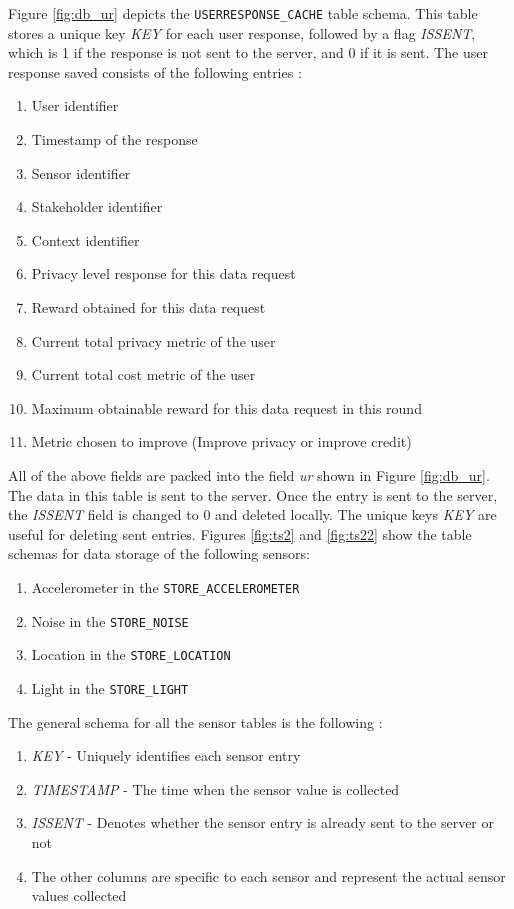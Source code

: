 Figure \ref{fig:db_ur} depicts the \texttt{USERRESPONSE\_CACHE} table schema. This table stores a unique key \textit{KEY} for each user response, followed by a flag \textit{ISSENT}, which is 1 if the response is not sent to the server, and 0 if it is sent. The user response saved consists of the following entries :

\begin{enumerate}
	\item User identifier
	\item Timestamp of the response
    \item Sensor identifier
    \item Stakeholder identifier
    \item Context identifier
    \item Privacy level response for this data request
    \item Reward obtained for this data request
    \item Current total privacy metric of the user
    \item Current total cost metric of the user
    \item Maximum obtainable reward for this data request in this round
    \item Metric chosen to improve  (Improve privacy or improve credit)
\end{enumerate}

All of the above fields are packed into the field \textit{ur} shown in Figure \ref{fig:db_ur}. The data in this table is sent to the server. Once the entry is sent to the server, the \textit{ISSENT} field is changed to 0 and deleted locally. The unique keys \textit{KEY} are useful for deleting sent entries. Figures \ref{fig:ts2} and \ref{fig:ts22} show the table schemas for data storage of the following sensors:

\begin{enumerate}
	\item Accelerometer in the \texttt{STORE\_ACCELEROMETER}
	\item Noise in the \texttt{STORE\_NOISE}
    \item Location in the  \texttt{STORE\_LOCATION}
    \item Light in the  \texttt{STORE\_LIGHT}
\end{enumerate}

The general schema for all the sensor tables is the following :

\begin{enumerate}
	\item \textit{KEY} - Uniquely identifies each sensor entry
	\item \textit{TIMESTAMP} - The time when the sensor value is collected
    \item \textit{ISSENT} - Denotes whether the sensor entry is already sent to the server or not
    \item The other columns are specific to each sensor and represent the actual sensor values collected 
\end{enumerate}

